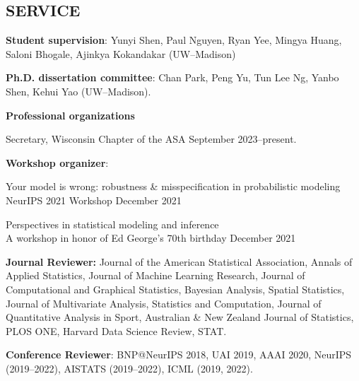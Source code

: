 \documentclass[margin]{res}
\begin{document}
\begin{resume}
\section{SERVICE}

\textbf{Student supervision}: Yunyi Shen, Paul Nguyen, Ryan Yee, Mingya Huang, Saloni Bhogale, Ajinkya Kokandakar (UW--Madison)

\textbf{Ph.D. dissertation committee}: Chan Park, Peng Yu, Tun Lee Ng, Yanbo Shen, Kehui Yao (UW--Madison).

\textbf{Professional organizations}

Secretary, Wisconsin Chapter of the ASA \hfill September 2023--present.


\textbf{Workshop organizer}: 

Your model is wrong: robustness \& misspecification in probabilistic modeling \\
NeurIPS 2021 Workshop \hfill December 2021

Perspectives in statistical modeling and inference \\
A workshop in honor of Ed George's 70th birthday \hfill December 2021


\textbf{Journal Reviewer:} Journal of the American Statistical Association, Annals of Applied Statistics, Journal of Machine Learning Research, Journal of Computational and Graphical Statistics, Bayesian Analysis, Spatial Statistics, Journal of Multivariate Analysis, Statistics and Computation, Journal of Quantitative Analysis in Sport, Australian \& New Zealand Journal of Statistics, PLOS ONE, Harvard Data Science Review, STAT. 

\textbf{Conference Reviewer}: BNP@NeurIPS 2018, UAI 2019, AAAI 2020,  NeurIPS (2019--2022), AISTATS (2019--2022), ICML (2019, 2022).
\end{resume} 
\end{document}
